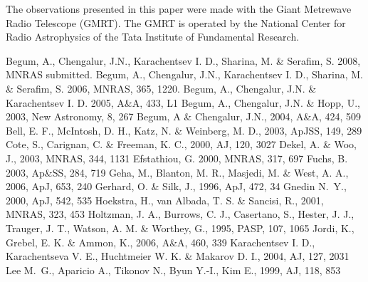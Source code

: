 \documentclass[useAMS,usenatbib]{mn2e}
\begin{document}
        The observations presented in this paper were made
with the Giant Metrewave Radio Telescope (GMRT). The GMRT is operated
by the National Center for Radio Astrophysics of the Tata Institute
of Fundamental Research.
\begin{thebibliography}{}
 Begum, A.,   Chengalur, J.N.,
	Karachentsev I. D., Sharina, M. \& Serafim, S. 2008, MNRAS submitted.
 Begum, A.,   Chengalur, J.N., Karachentsev I. D., Sharina, M. \& Serafim, S. 2006, MNRAS, 365, 1220. 
 Begum, A.,   Chengalur, J.N. \&
	Karachentsev I. D.  2005, A\&A, 433, L1 
 Begum, A.,  
	Chengalur, J.N. \& Hopp, U., 2003, New Astronomy, 8, 267
 Begum, A \& 
	Chengalur, J.N., 2004, A\&A, 424, 509
 Bell, E. F., McIntosh, D. H., Katz, N.
	\& Weinberg, M. D., 2003, ApJSS, 149, 289
 Cote, S., Carignan, C. \& Freeman, K. C., 2000, AJ, 120, 3027
 Dekel, A. \& Woo, J., 2003, MNRAS, 344, 1131
 Efstathiou, G.  2000, MNRAS, 317, 697
 Fuchs, B. 2003, Ap\&SS, 284, 719
 Geha, M., Blanton, M. R., Masjedi, M. \& 
	West, A. A., 2006, ApJ, 653, 240
 Gerhard, O. \& Silk, J., 1996, ApJ, 472, 34
 Gnedin N.~Y., 2000, ApJ, 542, 535 
Hoekstra, H., van Albada, T. S.
        \& Sancisi, R., 2001, MNRAS, 323, 453
 Holtzman, J. A., Burrows, C. J.,
	Casertano, S., Hester, J. J., Trauger, J. T., Watson, A. M. \& Worthey, G., 1995, PASP, 107, 1065
 Jordi, K., Grebel, E. K. \& Ammon, K., 2006, A\&A, 460, 339
 Karachentsev I. D., Karachentseva V. E., Huchtmeier W. K.
	\& Makarov D. I., 2004, AJ, 127, 2031
Lee M.~G., Aparicio A., Tikonov N., Byun Y.-I., Kim E., 1999, AJ, 118, 853

\end{thebibliography}
\end{document}
